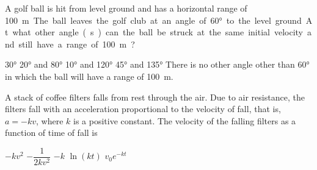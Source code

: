 \documentclass{../../oss-apphys-exam}
\begin{document}


\raggedcolumns

\begin{multicols*}{2}
  \begin{questions}
    \question A golf ball is hit from level ground and has a horizontal range of
    \SI{100}\metre. The ball leaves the golf club at an angle of \ang{60} to
    the level ground. At what other angle(s) can the ball be struck at the same
    initial velocity and still have a range of \SI{100}\metre?
    \begin{center}
    \end{center}
    \begin{choices}
      \choice\ang{30}
      \choice\ang{20} and \ang{80}
      \choice\ang{10} and \ang{120}
      \choice\ang{45} and \ang{135}
      \choice There is no other angle other than \ang{60} in which the ball will
      have a range of \SI{100}\metre.
    \end{choices}
    \vspace{.7in}
      
    \question A stack of coffee filters falls from rest through the air. Due to
    air resistance, the filters fall with an acceleration proportional to the
    velocity of fall, that is, $a=-kv$, where $k$ is a positive constant.
    The velocity of the falling filters as a function of time of fall is
    \begin{choices}
      \choice $-kv^2$
      \choice $-\dfrac1{2kv^2}$
      \choice $-k$
      \choice $\ln(kt)$
      \choice $v_0e^{-kt}$
    \end{choices}
    

\end{questions}
\end{multicols*}
\end{document}
